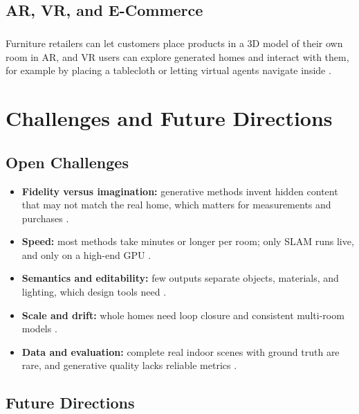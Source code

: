 \documentclass[12pt,a4paper,final]{extreport}
\begin{document}
\section{AR, VR, and E-Commerce}

\paragraph{} Furniture retailers can let customers place products in a 3D model of their own room in AR, and VR users can explore generated homes and interact with them, for example by placing a tablecloth or letting virtual agents navigate inside \cite{p2}.

\chapter{Challenges and Future Directions}

\section{Open Challenges}

\begin{itemize}
  \item \textbf{Fidelity versus imagination:} generative methods invent hidden content that may not match the real home, which matters for measurements and purchases \cite{p1,p2}.
  \item \textbf{Speed:} most methods take minutes or longer per room; only SLAM runs live, and only on a high-end GPU \cite{p3}.
  \item \textbf{Semantics and editability:} few outputs separate objects, materials, and lighting, which design tools need \cite{p1}.
  \item \textbf{Scale and drift:} whole homes need loop closure and consistent multi-room models \cite{p2,p3}.
  \item \textbf{Data and evaluation:} complete real indoor scenes with ground truth are rare, and generative quality lacks reliable metrics \cite{p2,p4}.
\end{itemize}

\section{Future Directions}
\end{document}
